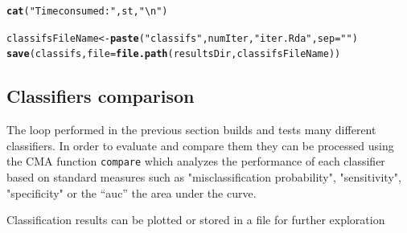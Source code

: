 \documentclass{article}\usepackage[]{graphicx}\usepackage[]{color}
\makeatletter
\newcommand{\hlstr}[1]{\textcolor[rgb]{0.192,0.494,0.8}{#1}}%
\newcommand{\hlstd}[1]{\textcolor[rgb]{0.345,0.345,0.345}{#1}}%
\newcommand{\hlkwb}[1]{\textcolor[rgb]{0.69,0.353,0.396}{#1}}%
\newcommand{\hlkwc}[1]{\textcolor[rgb]{0.333,0.667,0.333}{#1}}%
\newcommand{\hlkwd}[1]{\textcolor[rgb]{0.737,0.353,0.396}{\textbf{#1}}}%
\newenvironment{kframe}{%
 \def\at@end@of@kframe{}%
 \ifinner\ifhmode%
  \def\at@end@of@kframe{\end{minipage}}%
  \begin{minipage}{\columnwidth}%
 \fi\fi%
 \def\FrameCommand##1{\hskip\@totalleftmargin \hskip-\fboxsep
 \colorbox{shadecolor}{##1}\hskip-\fboxsep
     \hskip-\linewidth \hskip-\@totalleftmargin \hskip\columnwidth}%
 \MakeFramed {\advance\hsize-\width
   \@totalleftmargin\z@ \linewidth\hsize
   \@setminipage}}%
 {\par\unskip\endMakeFramed%
 \at@end@of@kframe}
\newenvironment{knitrout}{}{} %
\makeatother
\begin{document}
\begin{knitrout}
\begin{kframe}
{\ttfamily\noindent\bfseries{}}

{\ttfamily\noindent\itshape\color{messagecolor}{\#\# Timing stopped at: 14.31 0.059 14.38}}\begin{alltt}
\hlkwd{cat}\hlstd{(}\hlstr{"Time consumed: "}\hlstd{, st,} \hlstr{"\textbackslash{}n"}\hlstd{)}
\end{alltt}


{\ttfamily\noindent\bfseries{}}\begin{alltt}
\hlstd{classifsFileName} \hlkwb{<-} \hlkwd{paste}\hlstd{(}\hlstr{"classifs"}\hlstd{,numIter,}\hlstr{"iter.Rda"}\hlstd{,} \hlkwc{sep}\hlstd{=}\hlstr{""}\hlstd{)}
\hlkwd{save}\hlstd{(classifs,} \hlkwc{file}\hlstd{=}\hlkwd{file.path}\hlstd{(resultsDir,classifsFileName))}
\end{alltt}
\end{kframe}
\end{knitrout}

\subsection{Classifiers comparison}

The loop performed in the previous section builds and tests many different classifiers. In order to evaluate and compare them they can be processed using the CMA function \texttt{compare} which analyzes the performance of each classifier based on standard measures such as "misclassification probability", "sensitivity", "specificity" or the ``auc'' the area under the curve.

Classification results can be plotted or stored in a file for further exploration
\end{document}
